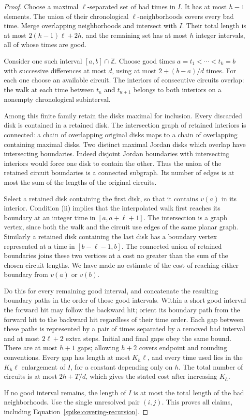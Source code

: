 \begin{proof}
Choose a maximal $\ell$-separated set of bad times in $I$.  It has at
most $h-1$ elements.  The union of their chronological $\ell$-neighborhoods
covers every bad time.  Merge overlapping neighborhoods and intersect
with $I$.  Their total length is at most $2(h-1)\ell+2h$, and the
remaining set has at most $h$ integer intervals, all of whose times are
good.

Consider one such interval $[a,b]\cap\mathbb Z$.  Choose good times
$a=t_1<\cdots<t_k=b$ with successive differences at most $d$, using at
most $2+(b-a)/d$ times.  For each one choose an available circuit.  The
interiors of consecutive circuits overlap: the walk at each time between
$t_u$ and $t_{u+1}$ belongs to both interiors on a nonempty chronological
subinterval.

Among this finite family retain the disks maximal for inclusion.  Every
discarded disk is contained in a retained disk.  The intersection graph
of retained interiors is connected: a chain of overlapping original
disks maps to a chain of overlapping containing maximal disks.  Two
distinct maximal Jordan disks which overlap have intersecting
boundaries.  Indeed disjoint Jordan boundaries with intersecting
interiors would force one disk to contain the other.  Thus the union of
the retained circuit boundaries is a connected subgraph.  Its number of
edges is at most the sum of the lengths of the original circuits.

Select a retained disk containing the first disk, so that it contains
$v(a)$ in its interior.  Condition (ii) implies that the interpolated
walk first reaches its boundary at an integer time in $[a,a+\ell+1]$.
The intersection is a graph vertex, since both the walk and the circuit
use edges of the same planar graph.  Similarly a retained disk containing
the last disk has a boundary vertex represented at a time in
$[b-\ell-1,b]$.  The connected union of retained boundaries joins these
two vertices at a cost no greater than the sum of the chosen circuit
lengths.  We have made no estimate of the cost of reaching either
boundary from $v(a)$ or $v(b)$.

Do this for every remaining good interval, and concatenate the resulting
boundary paths in the order of those good intervals.  Within a short good
interval the forward hit may follow the backward hit; orient its boundary
path from the forward hit to the backward hit regardless of their time
order.  Each gap between these paths is
represented by a pair of times separated by a removed bad interval and
at most $2\ell+2$ extra steps.  Initial and final gaps obey the same bound.
There are at most $h+1$ gaps; allowing $h+2$ covers endpoint and rounding
conventions.  Every gap has length at most $K_h\ell$, and every time used
lies in the $K_h\ell$ enlargement of $I$, for a constant depending only
on $h$.  The total number of circuits is at most
$2h+T/d$, which gives the stated cost after increasing $K_h$.

If no good interval remains, the length of $I$ is at most the total
length of the bad neighborhoods.  Use the single unresolved pair $(i,j)$.
This proves all claims, including Equation~\eqref{spike:covering-recursion}.
\end{proof}

